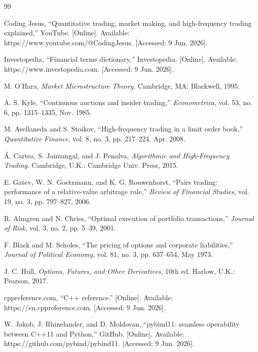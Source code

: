 \documentclass[12pt,oneside,a4paper]{report}
\begin{document}
\clearpage
\renewcommand{\bibname}{References}
\begin{thebibliography}{99}

 Coding Jesus, ``Quantitative trading, market making, and high-frequency trading explained,'' YouTube. [Online]. Available: https://www.youtube.com/@CodingJesus. [Accessed: 9 Jun. 2026].

 Investopedia, ``Financial terms dictionary,'' Investopedia. [Online]. Available: https://www.investopedia.com. [Accessed: 9 Jun. 2026].

 M. O'Hara, \textit{Market Microstructure Theory}. Cambridge, MA: Blackwell, 1995.

 A. S. Kyle, ``Continuous auctions and insider trading,'' \textit{Econometrica}, vol. 53, no. 6, pp. 1315--1335, Nov. 1985.

 M. Avellaneda and S. Stoikov, ``High-frequency trading in a limit order book,'' \textit{Quantitative Finance}, vol. 8, no. 3, pp. 217--224, Apr. 2008.

 \'A. Cartea, S. Jaimungal, and J. Penalva, \textit{Algorithmic and High-Frequency Trading}. Cambridge, U.K.: Cambridge Univ. Press, 2015.

 E. Gatev, W. N. Goetzmann, and K. G. Rouwenhorst, ``Pairs trading: performance of a relative-value arbitrage rule,'' \textit{Review of Financial Studies}, vol. 19, no. 3, pp. 797--827, 2006.

 R. Almgren and N. Chriss, ``Optimal execution of portfolio transactions,'' \textit{Journal of Risk}, vol. 3, no. 2, pp. 5--39, 2001.

 F. Black and M. Scholes, ``The pricing of options and corporate liabilities,'' \textit{Journal of Political Economy}, vol. 81, no. 3, pp. 637--654, May 1973.

 J. C. Hull, \textit{Options, Futures, and Other Derivatives}, 10th ed. Harlow, U.K.: Pearson, 2017.

 cppreference.com, ``C++ reference.'' [Online]. Available: https://en.cppreference.com. [Accessed: 9 Jun. 2026].

 W. Jakob, J. Rhinelander, and D. Moldovan, ``pybind11: seamless operability between C++11 and Python,'' GitHub. [Online]. Available: https://github.com/pybind/pybind11. [Accessed: 9 Jun. 2026].


\end{thebibliography}
\end{document}
